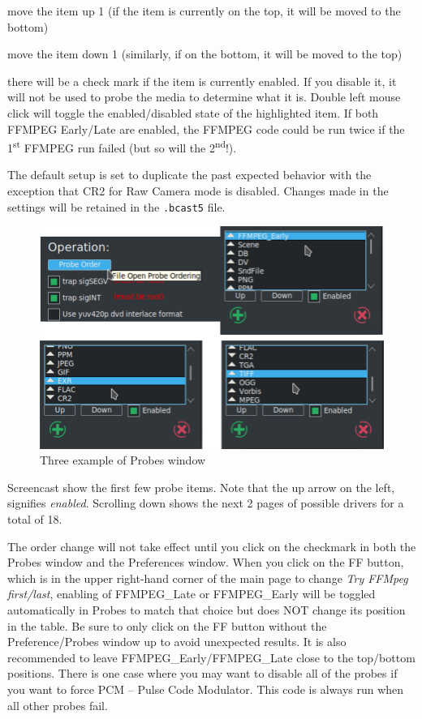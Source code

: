\begin{description} [noitemsep]
    \item[Up] move the item up 1 (if the item is currently on the top, it will be moved to the bottom)
    \item[Down] move the item down 1 (similarly, if on the bottom, it will be moved to the top)
    \item[Enable] there will be a check mark if the item is currently enabled.  If you disable it, it will not be used to probe the media to determine what it is.  Double left mouse click will toggle the enabled/disabled state of the highlighted item.  If both FFMPEG Early/Late are enabled, the FFMPEG code could be run twice if the 1\textsuperscript{st} FFMPEG run failed (but so will the 2\textsuperscript{nd}!).
\end{description}

The default setup is set to duplicate the past expected behavior with the exception that CR2 for Raw Camera mode is disabled.  Changes made in the settings will be retained in the \texttt{.bcast5} file.

\begin{figure}[htpb]
    \centering
    \includegraphics[width=0.9\linewidth]{images/probe.png}
    \caption{Three example of Probes window}
    \label{fig:probe}
\end{figure}

Screencast show the first few probe items.  Note that the up arrow on the left, signifies \textit{enabled}.
Scrolling down shows the next 2 pages of possible drivers for a total of 18.

The order change will not take effect until you click on the checkmark in both the Probes window and the Preferences window.  When you click on the FF button, which is in the upper right-hand corner of the main page to change \textit{Try FFMpeg first/last}, enabling of FFMPEG\_Late or FFMPEG\_Early will be toggled automatically in Probes to match that choice but does NOT change its position in the table. Be sure to only click on the FF button without the Preference/Probes window up to avoid unexpected results.  It is also recommended to leave FFMPEG\_Early/FFMPEG\_Late close to the top/bottom positions.  There is one case where you may want to disable all of the probes if you want to force PCM -- Pulse Code Modulator.  This code is always run when all other probes fail.

